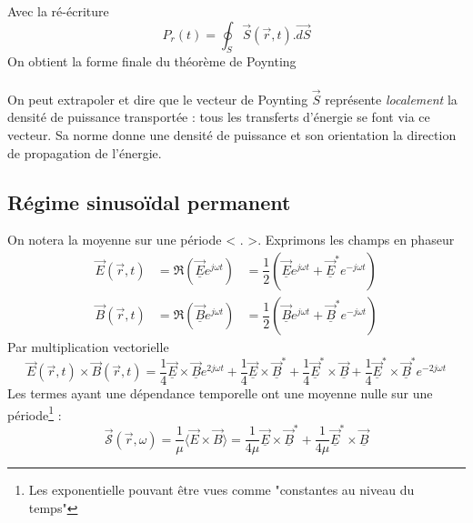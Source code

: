 	Avec la ré-écriture
	\begin{equation}
	P_r(t) = \oint_S \vec{S}(\vec{r},t).\vec{dS}
	\end{equation}
	On obtient la forme finale du théorème de Poynting \\
	\ \\
	
	On peut extrapoler et dire que le vecteur de Poynting $\vec{S}$ représente \textit{localement} 
	la densité de puissance transportée : tous les transferts d'énergie se font via ce vecteur. Sa 
	norme donne une densité de puissance et son orientation la direction de propagation de l'énergie. 
	
	
	\subsection{Régime sinusoïdal permanent}
	On notera la moyenne sur une période < . >. Exprimons les champs en phaseur
	\begin{equation}
	\begin{aligned}
	\vec{E}(\vec{r},t) &= \Re\left(\underline{\vec{E}}e^{j\omega t}\right) &= \dfrac{1}{2}\left(
	\underline{\vec{E}}e^{j\omega t}+\underline{\vec{E}}^*e^{-j\omega t}\right)\\
	\vec{B}(\vec{r},t) &= \Re\left(\underline{\vec{B}}e^{j\omega t}\right) &= \dfrac{1}{2}\left(
	\underline{\vec{B}}e^{j\omega t}+\underline{\vec{B}}^*e^{-j\omega t}\right)
	\end{aligned}
	\end{equation}
	Par multiplication vectorielle
	\begin{equation}
	\vec{E}(\vec{r},t)\times\vec{B}(\vec{r},t) = \frac{1}{4}\underline{\vec{E}}\times\underline{
	\vec{B}}e^{2j\omega t} +\frac{1}{4}\underline{\vec{E}}\times\underline{\vec{B}}^* + \frac{1}{4}
	\underline{\vec{E}}^*\times\underline{\vec{B}}+\frac{1}{4}
	\underline{\vec{E}}^*\times\underline{\vec{B}}^* e^{-2j\omega t}
	\end{equation}
	Les termes ayant une dépendance temporelle ont une moyenne nulle sur une période\footnote{Les 
	exponentielle pouvant être vues comme "constantes au niveau du temps"} :
	\begin{equation}
	\vec{\mathcal{S}}(\vec{r},\omega) = \frac{1}{\mu}\langle\vec{E}\times\vec{B}\rangle 
	=\dfrac{1}{4\mu}\underline{\vec{E}}\times\underline{\vec{B}}^* + \frac{1}{4\mu}
	\underline{\vec{E}}^*\times\underline{\vec{B}}
	\end{equation}
	
